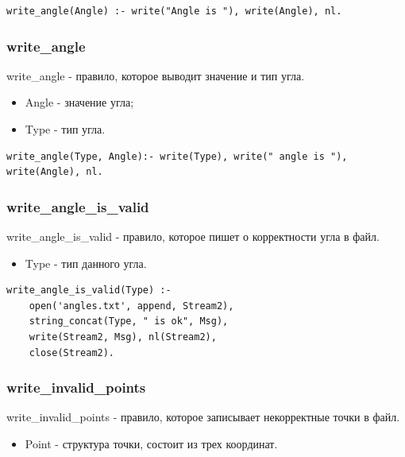 \begin{lstlisting}[caption=Реализация правила write\_angle, label=rules:writeangle]
write_angle(Angle) :- write("Angle is "), write(Angle), nl.
\end{lstlisting}

\subsubsection{write\_angle}
\hspace{0.6cm} write\_angle - правило, которое выводит значение и тип угла.

\begin{itemize}
	\item Angle - значение угла;
	\item Type - тип угла.
\end{itemize}

\begin{lstlisting}[caption=Реализация правила write\_angle, label=rules:writeangle]
write_angle(Type, Angle):- write(Type), write(" angle is "), write(Angle), nl.
\end{lstlisting}

\subsubsection{write\_angle\_is\_valid}
\hspace{0.6cm} write\_angle\_is\_valid - правило, которое пишет о корректности угла в файл.

\begin{itemize}
	\item Type - тип данного угла.
\end{itemize}

\begin{lstlisting}[caption=Реализация правила write\_angle\_is\_valid, label=rules:writeangleisvalid]
write_angle_is_valid(Type) :- 
	open('angles.txt', append, Stream2),
	string_concat(Type, " is ok", Msg),
	write(Stream2, Msg), nl(Stream2),
	close(Stream2).
\end{lstlisting}

\subsubsection{write\_invalid\_points}
\hspace{0.6cm} write\_invalid\_points - правило, которое записывает некорректные точки в файл.

\begin{itemize}
	\item Point - структура точки, состоит из трех координат.
\end{itemize}

